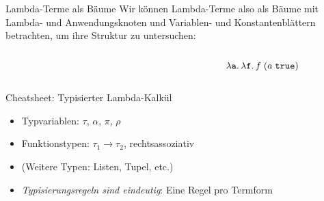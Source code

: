 \documentclass{beamer}
\begin{document}
\begin{frame}{Lambda-Terme als Bäume}
  Wir können Lambda-Terme also als Bäume mit Lambda- und Anwendungsknoten und Variablen- und Konstantenblättern betrachten, um ihre Struktur zu untersuchen:

  \begin{columns}
    \begin{column}{0.5\textwidth}
      \begin{figure}
      \end{figure}
    \end{column}
    \begin{column}{0.35\textwidth}
      \begin{equation*}
        \lambda \texttt{a}.\, \lambda \texttt{f}.\, f\;(a\;\texttt{true})
      \end{equation*}
    \end{column}
  \end{columns}
\end{frame}

\begin{frame}{Cheatsheet: Typisierter Lambda-Kalkül}

  \begin{itemize}
    \item Typvariablen: $\tau$, $\alpha$, $\pi$, $\rho$
    \item Funktionstypen: $\tau_1 \to \tau_2$, rechtsassoziativ
    \item (Weitere Typen: Listen, Tupel, etc.)
    \item \emph{Typisierungsregeln sind eindeutig}: Eine Regel pro Termform
  \end{itemize}
\end{frame}
\end{document}

